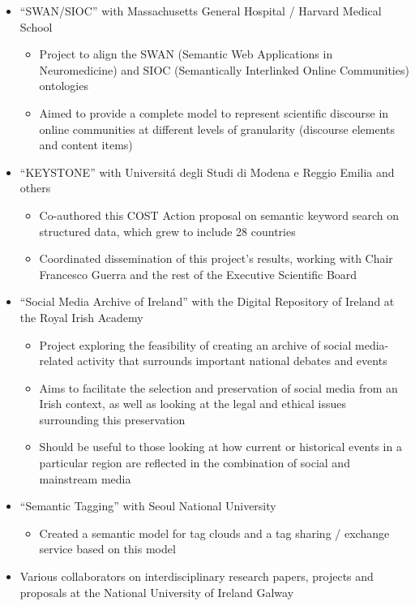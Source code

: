 \documentclass[10pt,a4paper]{res} %
\begin{document}
\begin{resume}
\begin{itemize} \itemsep -2pt
\item ``SWAN/SIOC'' with Massachusetts General Hospital / Harvard Medical School
\begin{itemize} \itemsep -2pt
\item Project to align the SWAN (Semantic Web Applications in Neuromedicine) and SIOC (Semantically Interlinked Online Communities) ontologies
\item Aimed to provide a complete model to represent scientific discourse in online communities at different levels of granularity (discourse elements and content items)
\end{itemize}
\item ``KEYSTONE'' with Universit\'{a} degli Studi di Modena e Reggio Emilia and others
\begin{itemize} \itemsep -2pt
\item Co-authored this COST Action proposal on semantic keyword search on structured data, which grew to include 28 countries
\item Coordinated dissemination of this project's results, working with Chair Francesco Guerra and the rest of the Executive Scientific Board
\end{itemize}
\item ``Social Media Archive of Ireland'' with the Digital Repository of Ireland at the Royal Irish Academy
\begin{itemize} \itemsep -2pt
\item Project exploring the feasibility of creating an archive of social media-related activity that surrounds important national debates and events
\item Aims to facilitate the selection and preservation of social media from an Irish context, as well as looking at the legal and ethical issues surrounding this preservation
\item Should be useful to those looking at how current or historical events in a particular region are reflected in the combination of social and mainstream media
\end{itemize}
\item ``Semantic Tagging'' with Seoul National University
\begin{itemize} \itemsep -2pt
\item Created a semantic model for tag clouds and a tag sharing / exchange service based on this model
\end{itemize}
\item Various collaborators on interdisciplinary research papers, projects and proposals at the National University of Ireland Galway

\end{itemize}
\end{resume}
\end{document}
